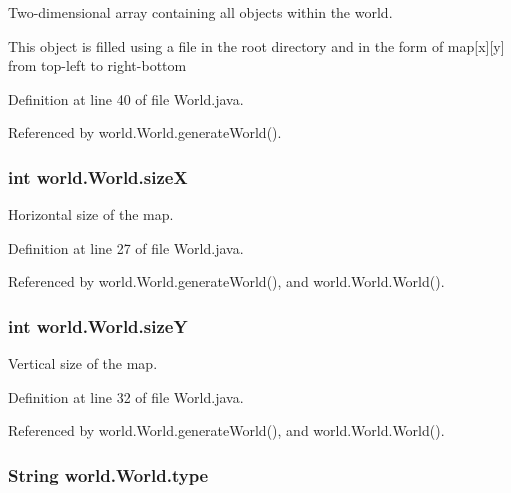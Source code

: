 Two-\/dimensional array containing all objects within the world. 

This object is filled using a file in the root directory and in the form of map\mbox{[}x\mbox{]}\mbox{[}y\mbox{]} from top-\/left to right-\/bottom 

Definition at line 40 of file World.\-java.



Referenced by world.\-World.\-generate\-World().

\hypertarget{a00039_ab2ca92c9d2a56f6fa1872dc6cf0f4ab3}{
\subsubsection[{size\-X}]{\setlength{\rightskip}{0pt plus 5cm}int world.\-World.\-size\-X\hspace{0.3cm}{\ttfamily [protected]}}}\label{a00039_ab2ca92c9d2a56f6fa1872dc6cf0f4ab3}


Horizontal size of the map. 



Definition at line 27 of file World.\-java.



Referenced by world.\-World.\-generate\-World(), and world.\-World.\-World().

\hypertarget{a00039_a3a110ad1276dc7dfa6bc47d9a663ec5e}{
\subsubsection[{size\-Y}]{\setlength{\rightskip}{0pt plus 5cm}int world.\-World.\-size\-Y\hspace{0.3cm}{\ttfamily [protected]}}}\label{a00039_a3a110ad1276dc7dfa6bc47d9a663ec5e}


Vertical size of the map. 



Definition at line 32 of file World.\-java.



Referenced by world.\-World.\-generate\-World(), and world.\-World.\-World().

\hypertarget{a00039_a008564127f7e69c09224a84ca7081893}{
\subsubsection[{type}]{\setlength{\rightskip}{0pt plus 5cm}String world.\-World.\-type\hspace{0.3cm}{\ttfamily [protected]}}}\label{a00039_a008564127f7e69c09224a84ca7081893}


